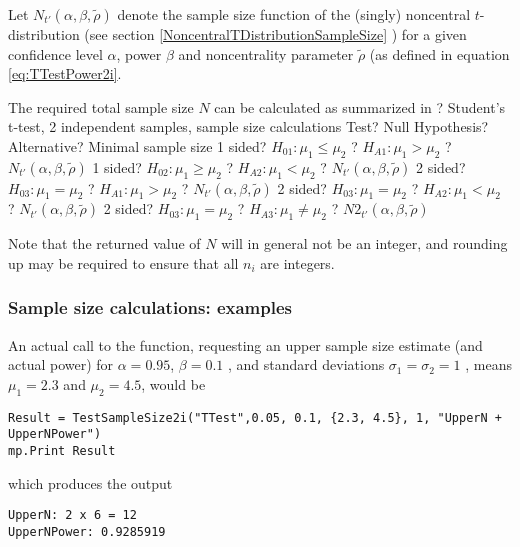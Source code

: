 Let $N_{t'}\left(\alpha, \beta, \widetilde{\rho} \right)$ denote the sample size function of the (singly) noncentral $t$-distribution (see section \ref{NoncentralTDistributionSampleSize} ) for a given confidence level $\alpha$, power $\beta$ and noncentrality parameter $\widetilde{\rho}$ (as defined in equation \ref{eq:TTestPower2i}.


\mpTableFourColsTwoRowsThreeRows
{The required total sample size $N$ can be calculated as summarized in ? Student's t-test, 2 independent samples, sample size calculations}
{Test? Null Hypothesis? Alternative? Minimal sample size}
{1 sided? $H_{01}: \mu_1 \leq \mu_2$ ? $H_{A1}: \mu_1 > \mu_2$ ? $N_{t'}\left(\alpha, \beta, \widetilde{\rho} \right)$}
{1 sided? $H_{02}: \mu_1 \geq \mu_2$ ? $H_{A2}: \mu_1 < \mu_2$ ? $N_{t'}\left(\alpha, \beta, \widetilde{\rho} \right)$}
{2 sided? $H_{03}: \mu_1 = \mu_2$ ? $H_{A1}: \mu_1 > \mu_2$ ? $N_{t'}\left(\alpha, \beta, \widetilde{\rho} \right)$}
{2 sided? $H_{03}: \mu_1 = \mu_2$ ? $H_{A2}: \mu_1 < \mu_2$ ? $N_{t'}\left(\alpha, \beta, \widetilde{\rho} \right)$}
{2 sided? $H_{03}: \mu_1 = \mu_2$ ? $H_{A3}: \mu_1 \neq \mu_2$ ? $N2_{t'}\left(\alpha, \beta, \widetilde{\rho} \right)$}

 Note that the returned value of $N$ will in general not be an integer, and rounding up may be required to ensure that all $n_i$ are integers.



\subsubsection{Sample size calculations: examples}
An actual call to the function, requesting an upper sample size estimate (and actual power) for $\alpha = 0.95$, $\beta=0.1$ , and standard deviations $\sigma_1=\sigma_2=1$ , means $\mu_1=2.3$ and $\mu_2=4.5$,   would be

\begin{lstlisting}
Result = TestSampleSize2i("TTest",0.05, 0.1, {2.3, 4.5}, 1, "UpperN + UpperNPower")
mp.Print Result
\end{lstlisting}
which produces the output

\begin{verbatim}
UpperN: 2 x 6 = 12
UpperNPower: 0.9285919
\end{verbatim}



